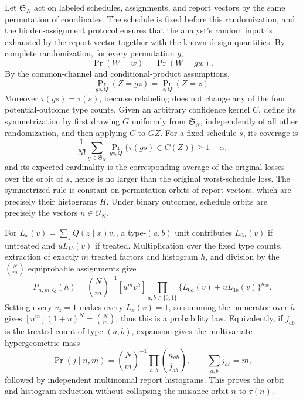 Let \(\mathfrak S_N\) act on labeled schedules, assignments, and report vectors by the same permutation of coordinates.  The schedule is fixed before this randomization, and the hidden-assignment protocol ensures that the analyst's random input is exhausted by the report vector together with the known design quantities.  By complete randomization, for every permutation \(g\),
\[
 \Pr(W=w)=\Pr(W=gw).
\]
By the common-channel and conditional-product assumptions,
\[
 \Pr_{gs,Q}(Z=gz)=\Pr_{s,Q}(Z=z).
\]
Moreover \(\tau(gs)=\tau(s)\), because relabeling does not change any of the four potential-outcome type counts.  Given an arbitrary confidence kernel \(C\), define its symmetrization by first drawing \(G\) uniformly from \(\mathfrak S_N\), independently of all other randomization, and then applying \(C\) to \(GZ\).  For a fixed schedule \(s\), its coverage is
\[
 \frac1{N!}\sum_{g\in\mathfrak S_N}
 \Pr_{gs,Q}\{\tau(gs)\in C(Z)\}\ge 1-\alpha,
\]
and its expected cardinality is the corresponding average of the original losses over the orbit of \(s\), hence is no larger than the original worst-schedule loss.  The symmetrized rule is constant on permutation orbits of report vectors, which are precisely their histograms \(H\).  Under binary outcomes, schedule orbits are precisely the vectors \(n\in\mathcal O_N\).

For \(L_x(v)=\sum_zQ(z\mid x)v_z\), a type-\((a,b)\) unit contributes \(L_{0a}(v)\) if untreated and \(uL_{1b}(v)\) if treated.  Multiplication over the fixed type counts, extraction of exactly \(m\) treated factors and histogram \(h\), and division by the \(\binom Nm\) equiprobable assignments give
\[
 P_{n,m,Q}(h)=\binom Nm^{-1}[u^mv^h]
 \prod_{a,b\in\{0,1\}}\{L_{0a}(v)+uL_{1b}(v)\}^{n_{ab}}.
\]
Setting every \(v_z=1\) makes every \(L_x(v)=1\), so summing the numerator over \(h\) gives \([u^m](1+u)^N=\binom Nm\); thus this is a probability law.  Equivalently, if \(j_{ab}\) is the treated count of type \((a,b)\), expansion gives the multivariate hypergeometric mass
\[
 \Pr(j\mid n,m)=\binom Nm^{-1}\prod_{a,b}\binom{n_{ab}}{j_{ab}},
 \qquad \sum_{a,b}j_{ab}=m,
\]
followed by independent multinomial report histograms.  This proves the orbit and histogram reduction without collapsing the nuisance orbit \(n\) to \(\tau(n)\).

